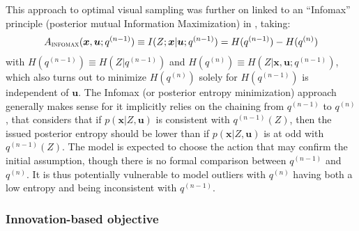 \documentclass[12pt,twoside,openright]{article}
\begin{document}
This approach to optimal visual sampling was further on linked to an ``Infomax'' principle {\color{Purple} (posterior mutual Information Maximization)} in \citet{butko2010infomax}, 
taking:
\begin{align}A_\text{\sc infomax}(\boldsymbol{x}, \boldsymbol{u}; q^{(n-1)}) \equiv I(Z; \boldsymbol{x}|\boldsymbol{u}; q^{(n-1)})
= H(q^{(n-1)}) - H(q^{(n)})
\label{eq:infomax}
\end{align}
with  $H(q^{(n-1)}) \equiv H(Z|q^{(n-1)})$ and $H(q^{(n)}) \equiv H(Z|\boldsymbol{x}, \boldsymbol{u}; q^{(n-1)})$, {\color{Purple} which also turns out to minimize $H(q^{(n)})$ solely for $H(q^{(n-1)})$ is independent of $\boldsymbol{u}$}.
The Infomax (or posterior entropy minimization) approach generally makes sense for it implicitly relies on the chaining from $q^{(n-1)}$ to $q^{(n)}$, that considers that if $p(\boldsymbol{x}|Z, \boldsymbol{u})$ is consistent with $q^{(n-1)}(Z)$, then the issued posterior entropy should be lower than if $p(\boldsymbol{x}|Z, \boldsymbol{u})$ is at odd with $q^{(n-1)}(Z)$. The model is expected to choose the action that may confirm the initial assumption, though there is no formal comparison between $q^{(n-1)}$ and $q^{(n)}$.
It is thus potentially vulnerable to model outliers with $q^{(n)}$ having both a low entropy and being inconsistent with $q^{(n-1)}$.

\subsubsection{Innovation-based objective}\label{sec:saliency}
\end{document}

